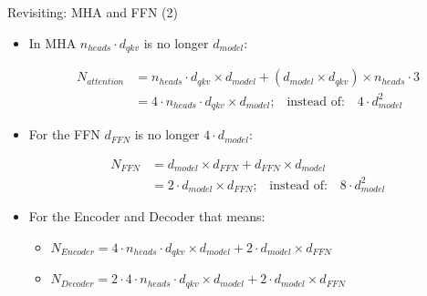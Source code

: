 	
	\begin{frame}{Revisiting: MHA and FFN (2)}
	
	\begin{itemize}
		\item In MHA $n_{heads} \cdot d_{qkv}$ is no longer $d_{model}$:
	
	$$
	\begin{aligned}
	N_{attention} &= n_{heads} \cdot d_{qkv} \times d_{model} + (d_{model} \times d_{qkv}) \times n_{heads} \cdot 3 \\
	&= 4\cdot n_{heads}\cdot d_{qkv} \times d_{model}\text{;}\quad \text{instead of:}\quad 4\cdot d_{model}^2
	\end{aligned}
	$$
	
	\hspace{}
		
		\item For the FFN $d_{FFN}$ is no longer $4\cdot d_{model}$:
	
	$$    
	\begin{aligned}
	N_{FFN} &= d_{model} \times d_{FFN} + d_{FFN} \times d_{model} \\
	&= 2\cdot d_{model} \times d_{FFN}\text{;}\quad \text{instead of:}\quad 8\cdot d_{model}^2
	\end{aligned}
	$$
	
	\hspace{}
	
		\item For the Encoder and Decoder that means:
		\begin{itemize}
			\item $N_{Encoder} = 4\cdot n_{heads}\cdot d_{qkv} \times d_{model} + 2\cdot d_{model} \times d_{FFN}$
			\item $N_{Decoder} = 2\cdot 4\cdot n_{heads}\cdot d_{qkv} \times d_{model} + 2\cdot d_{model} \times d_{FFN} $
		\end{itemize}
	
	\end{itemize}
		
	\end{frame}
	
	
